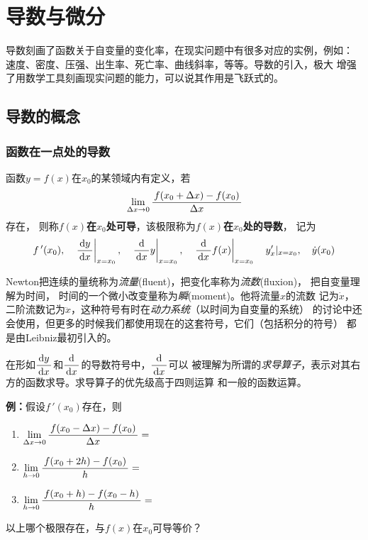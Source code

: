 \setcounter{chapter}{1}

\chapter{导数与微分}

导数刻画了函数关于自变量的变化率，在现实问题中有很多对应的实例，例如：
速度、密度、压强、出生率、死亡率、曲线斜率，等等。导数的引入，极大
增强了用数学工具刻画现实问题的能力，可以说其作用是飞跃式的。

\section{导数的概念}

\subsection{函数在一点处的导数}

\begin{thx}
	函数$y=f(x)$在$x_0$的某领域内有定义，若
	$$\lim\limits_{\Delta x\to 0}\displaystyle\frac{\,{f(x_0+\Delta x)-f(x_0)}\,}{\,{\Delta x}\,}$$
	存在， 则称{\bf $f(x)$在$x_0$处可导}，该极限称为{\bf $f(x)$在$x_0$处的导数}， 记为
	$$f\,'(x_0),\quad \left.\displaystyle\frac{\,{\mathrm{d} y}\,}{\,{\mathrm{d} x}\,}\right|_{x=x_0},\quad\left.\displaystyle\frac{\,{\mathrm{d}
	}\,}{\,{\mathrm{d} x}\,}y\right|_{x=x_0},\quad \left.\displaystyle\frac{\,{\mathrm{d} }\,}{\,{\mathrm{d} x}\,}f(x)\right|_{x=x_0}\quad
	y'_x|_{x=x_0},\quad \dot{y}(x_0)$$
\end{thx}

\begin{shaded}
	Newton把连续的量统称为{\it 流量}(fluent)，把变化率称为{\it 流数}(fluxion)，
	把自变量理解为时间，	时间的一个微小改变量称为{\it 瞬}(moment)。他将流量$x$的流数
	记为$\dot{x}$，二阶流数记为$\ddot{x}$，这种符号有时在{\it 动力系统}（以时间为自变量的系统）
	的讨论中还会使用，但更多的时候我们都使用现在的这套符号，它们（包括积分的符号）
	都是由Leibniz最初引入的。
\end{shaded}

在形如$\displaystyle\frac{\,{\mathrm{d} y}\,}{\,{\mathrm{d} x}\,}$和$\displaystyle\frac{\,{\mathrm{d}}\,}{\,{\mathrm{d} x}\,}$的导数符号中，$\displaystyle\frac{\,{\mathrm{d}}\,}{\,{\mathrm{d} x}\,}$可以
被理解为所谓的{\it 求导算子}，表示对其右方的函数求导。求导算子的优先级高于四则运算
和一般的函数运算。

{\bf 例：}假设$f\,'(x_0)$存在，则
\begin{enumerate}[(1)]
  \setlength{\itemindent}{1cm}
  \item $\lim\limits_{\Delta x\to 0}\displaystyle\frac{\,{f(x_0-\Delta x)-f(x_0)}\,}{\,{\Delta
  x}\,}=$ \underline{\quad} 
  \item $\lim\limits_{h\to 0}\displaystyle\frac{\,{f(x_0+2h)-f(x_0)}\,}{\,{h}\,}=$
   \underline{\quad} 
  \item $\lim\limits_{h\to 0}\displaystyle\frac{\,{f(x_0+h)-f(x_0-h)}\,}{\,{h}\,}=$ 
  \underline{\quad}
\end{enumerate}
以上哪个极限存在，与$f(x)$在$x_0$可导等价？

